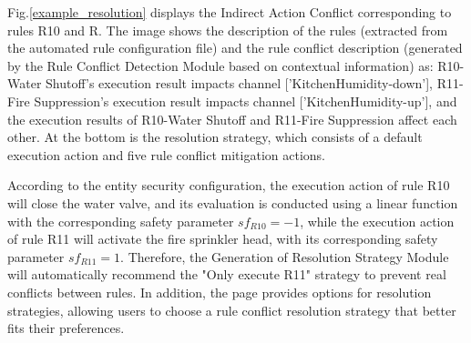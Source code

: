 Fig.\ref{example_resolution} displays the Indirect Action Conflict corresponding to rules R10 and R. The image shows the description of the rules (extracted from the automated rule configuration file) and the rule conflict description (generated by the Rule Conflict Detection Module based on contextual information) as: R10-Water Shutoff's execution result impacts channel ['KitchenHumidity-down'], R11-Fire Suppression's execution result impacts channel ['KitchenHumidity-up'], and the execution results of R10-Water Shutoff and R11-Fire Suppression affect each other. At the bottom is the resolution strategy, which consists of a default execution action and five rule conflict mitigation actions.

According to the entity security configuration, the execution action of rule R10 will close the water valve, and its evaluation is conducted using a linear function with the corresponding safety parameter $sf_{R10}=-1$, while the execution action of rule R11 will activate the fire sprinkler head, with its corresponding safety parameter $sf_{R11}=1$. Therefore, the Generation of Resolution Strategy Module will automatically recommend the "Only execute R11" strategy to prevent real conflicts between rules. In addition, the page provides options for resolution strategies, allowing users to choose a rule conflict resolution strategy that better fits their preferences.

